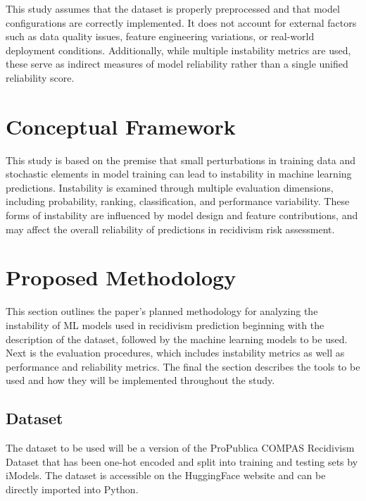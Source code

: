 \documentclass{article}
\begin{document}
This study assumes that the dataset is properly preprocessed and that model configurations are correctly implemented. It does not account for external factors such as data quality issues, feature engineering variations, or real-world deployment conditions. Additionally, while multiple instability metrics are used, these serve as indirect measures of model reliability rather than a single unified reliability score.

\section{Conceptual Framework} %
This study is based on the premise that small perturbations in training data and stochastic elements in model training can lead to instability in machine learning predictions. Instability is examined through multiple evaluation dimensions, including probability, ranking, classification, and performance variability. These forms of instability are influenced by model design and feature contributions, and may affect the overall reliability of predictions in recidivism risk assessment.

\section{Proposed Methodology}
This section outlines the paper's planned methodology for analyzing the instability of ML models used in recidivism prediction beginning with the description of the dataset, followed by the machine learning models to be used. Next is the evaluation procedures, which includes instability metrics as well as performance and reliability metrics. The final the section describes the tools to be used and how they will be implemented throughout the study. 

\subsection{Dataset} %
The dataset to be used will be a version of the ProPublica COMPAS Recidivism Dataset that has been one-hot encoded and split into training and testing sets by iModels. The dataset is accessible on the HuggingFace website and can be directly imported into Python.
\end{document}
